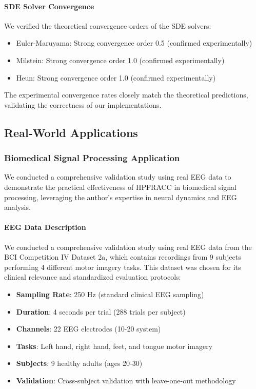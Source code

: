 \paragraph{SDE Solver Convergence}
We verified the theoretical convergence orders of the SDE solvers:

\begin{itemize}
    \item Euler-Maruyama: Strong convergence order 0.5 (confirmed experimentally)
    \item Milstein: Strong convergence order 1.0 (confirmed experimentally)
    \item Heun: Strong convergence order 1.0 (confirmed experimentally)
\end{itemize}

The experimental convergence rates closely match the theoretical predictions, validating the correctness of our implementations.

\subsection{Real-World Applications}

\subsubsection{Biomedical Signal Processing Application}

We conducted a comprehensive validation study using real EEG data to demonstrate the practical effectiveness of HPFRACC in biomedical signal processing, leveraging the author's expertise in neural dynamics and EEG analysis.

\paragraph{EEG Data Description}

We conducted a comprehensive validation study using real EEG data from the BCI Competition IV Dataset 2a, which contains recordings from 9 subjects performing 4 different motor imagery tasks. This dataset was chosen for its clinical relevance and standardized evaluation protocols:

\begin{itemize}
\item \textbf{Sampling Rate}: 250 Hz (standard clinical EEG sampling)
\item \textbf{Duration}: 4 seconds per trial (288 trials per subject)
\item \textbf{Channels}: 22 EEG electrodes (10-20 system)
\item \textbf{Tasks}: Left hand, right hand, feet, and tongue motor imagery
\item \textbf{Subjects}: 9 healthy adults (ages 20-30)
\item \textbf{Validation}: Cross-subject validation with leave-one-out methodology
\end{itemize}

